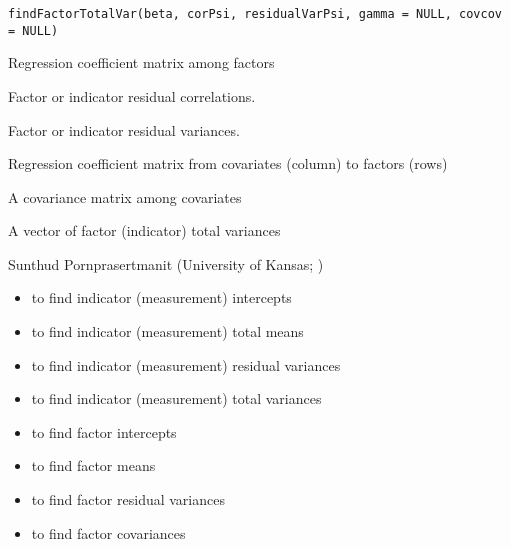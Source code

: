 \documentclass[a4paper]{book}
\begin{document}
%
\begin{Usage}
\begin{verbatim}
findFactorTotalVar(beta, corPsi, residualVarPsi, gamma = NULL, covcov = NULL)
\end{verbatim}
\end{Usage}
%
\begin{Arguments}
\begin{ldescription}
\item[\code{beta}] 
Regression coefficient matrix among factors

\item[\code{corPsi}] 
Factor or indicator residual correlations.

\item[\code{residualVarPsi}] 
Factor or indicator residual variances. 

\item[\code{gamma}] 
Regression coefficient matrix from covariates (column) to factors (rows)

\item[\code{covcov}] 
A covariance matrix among covariates

\end{ldescription}
\end{Arguments}
%
\begin{Value}
A vector of factor (indicator) total variances
\end{Value}
%
\begin{Author}\relax
Sunthud Pornprasertmanit (University of Kansas; )
\end{Author}
%
\begin{SeeAlso}\relax
\begin{itemize}

\item {} to find indicator (measurement) intercepts
\item {} to find indicator (measurement) total means
\item {} to find indicator (measurement) residual variances
\item {} to find indicator (measurement) total variances
\item {} to find factor intercepts
\item {} to find factor means
\item {} to find factor residual variances
\item {} to find factor covariances

\end{itemize}

\end{SeeAlso}
\end{document}
